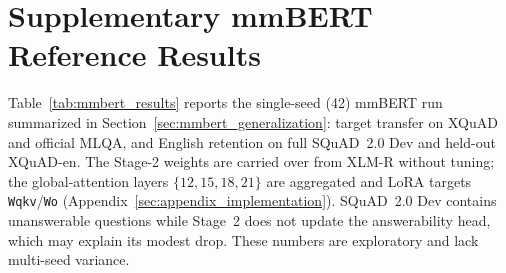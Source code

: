 \documentclass[11pt]{article}
\begin{document}
\section{Supplementary mmBERT Reference Results}
\label{sec:appendix_mmbert}
Table~\ref{tab:mmbert_results} reports the single-seed (42) mmBERT run summarized in Section~\ref{sec:mmbert_generalization}: target transfer on XQuAD and official MLQA, and English retention on full SQuAD~2.0 Dev and held-out XQuAD-en. The Stage-2 weights are carried over from XLM-R without tuning; the global-attention layers $\{12,15,18,21\}$ are aggregated and LoRA targets \texttt{Wqkv}/\texttt{Wo} (Appendix~\ref{sec:appendix_implementation}). SQuAD~2.0 Dev contains unanswerable questions while Stage~2 does not update the answerability head, which may explain its modest drop. These numbers are exploratory and lack multi-seed variance.
\end{document}
